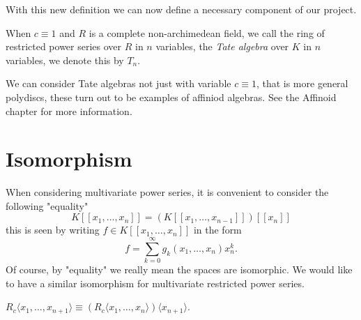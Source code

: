 With this new definition we can now define a necessary component of our project.

\begin{definition}
  When $c \equiv 1$ and $R$ is a complete non-archimedean field, we call the ring of restricted power
  series over $R$ in $n$ variables, the \emph{Tate algebra} over $K$ in $n$ variables, we denote this
  by $T_n$.
\end{definition}

We can consider Tate algebras not just with variable $c \equiv 1$, that is more general polydiscs,
these turn out to be examples of affiniod algebras. See the Affinoid chapter for more information.



\section{Isomorphism}

When considering multivariate power series, it is convenient to consider the following "equality"
\[
  K [ \! [ x_1, \dots, x_n ] \! ] = (K [ \! [ x_1, \dots, x_{n-1} ] \! ])[\![ x_n ]\!]
\]
this is seen by writing $f \in K [ \! [ x_1, \dots, x_n ] \! ]$ in the form
\[
  f = \sum_{k = 0}^\infty g_k (x_1, \dots, x_n) x_n^k.
\]
Of course, by "equality" we really mean the spaces are isomorphic. We would like to have a similar
isomorphism for multivariate restricted power series.

\begin{lemma}
  $R_c \langle x_1, \dots, x_{n + 1} \rangle \equiv
  (R_c \langle x_1, \dots, x_n \rangle) \langle x_{n+1} \rangle.$
\end{lemma}

